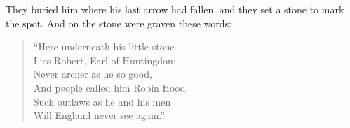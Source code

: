They buried him where his last arrow had fallen, and they set a stone to
mark the spot. And on the stone were graven these words:

\begin{quote}
“Here underneath his little stone\\
Lies Robert, Earl of Huntingdon;\\
Never archer as he so good,\\
And people called him Robin Hood.\\
Such outlaws as he and his men\\
Will England never see again.”
\end{quote}
